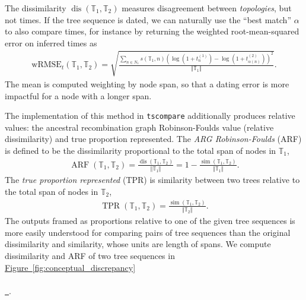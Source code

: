 \documentclass[10pt,twoside,lineno]{gsajnl}
\newcommand{\T}{\mathbb{T}}
\newcommand{\dis}{\operatorname{dis}}
\newcommand{\similarity}{\operatorname{sim}}
\newcommand*{\figref}[2][]{%
	\hyperref[{#2}]{%
		Figure~\ref*{#2}%
		\ifx\\#1\\%
		\else
		\,#1%
		\fi
	}%
}
\begin{document}
The dissimilarity $\dis(\T_1, \T_2)$ measures disagreement between \emph{topologies},
but not times.
If the tree sequence is dated, we can naturally use the ``best match'' $\alpha$
to also compare times,
for instance by returning the weighted root-mean-squared error on inferred times as
\begin{align}\label{eqn:wrmse}
    \text{wRMSE}_t(\T_1, \T_2)
    = \sqrt{\frac{
        \sum_{n \in N_1} s(\T_1,n) \left(\log\left(1+ t^{(1)}_n\right) - \log\left(1+ t^{(2)}_{\alpha(n)}\right) \right)^2 
    }{
        \Vert{\T_1}\Vert
    } } .
\end{align}
The mean is computed weighting by node span, so that a dating error
is more impactful for a node with a longer span. 

The implementation of this method in \texttt{tscompare}
additionally produces relative values:
the ancestral recombination graph Robinson-Foulds value (relative dissimilarity) and true proportion represented. 
The \emph{ARG Robinson-Foulds} (ARF) is defined to be the dissimilarity proportional
 to the total span of nodes in $\T_1$,
 \begin{align}\label{eqn:dissimilarity}
 	\operatorname{ARF}(\T_1,\T_2)=\frac{\dis(\T_1,\T_2)}{\Vert \T_1 \Vert}
 	=1-\frac{\similarity(\T_1,\T_2)}{\Vert \T_1\Vert}.
\end{align}
The \emph{true proportion represented} (TPR) is similarity between two trees relative 
to the total span of nodes in $\T_2$,
\begin{align}\label{eqn:true-proportion}
	\operatorname{TPR}(\T_1,\T_2) = \frac{\similarity(\T_1,\T_2)}
	{\Vert \T_2\Vert}.
\end{align}
The outputs framed as proportions relative to one of the given tree sequences is more easily understood
for comparing pairs of tree sequences than the original dissimilarity and similarity, whose units are length of spans.
We compute dissimilarity and ARF of two tree sequences in \figref{fig:conceptual_discrepancy}.
\end{document}
